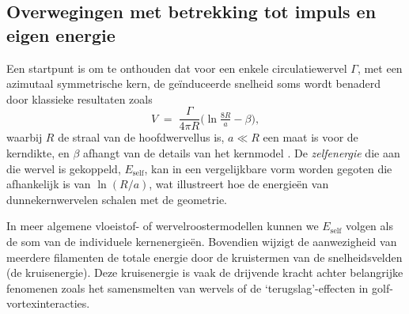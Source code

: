 \subsection{Overwegingen met betrekking tot impuls en eigen energie}
\label{sec:impuls}
Een startpunt is om te onthouden dat voor een enkele circulatiewervel $\Gamma$, met een
azimutaal symmetrische kern, de geïnduceerde snelheid soms wordt benaderd door
klassieke resultaten zoals
\begin{equation}
V \;=\; \frac{\Gamma}{4 \pi R}
\bigl(\ln \tfrac{8 R}{a} - \beta \bigr),\label{eq:appendix:velocity}
\end{equation}
waarbij $R$ de straal van de hoofdwervellus is, $a \ll R$ een maat is voor de kerndikte,
en $\beta$ afhangt van de details van het kernmodel \cite{Saffman1992}. De
\emph{zelfenergie} die aan die wervel is gekoppeld, $E_{\text{self}}$, kan in een
vergelijkbare vorm worden gegoten die afhankelijk is van $\ln(R/a)$, wat illustreert hoe de energieën van dunnekernwervelen
schalen met de geometrie.

In meer algemene vloeistof- of wervelroostermodellen kunnen we $E_{\text{self}}$ volgen als de
som van de individuele kernenergieën. Bovendien wijzigt de aanwezigheid van meerdere filamenten
de totale energie door de kruistermen van de snelheidsvelden (de kruisenergie). Deze
kruisenergie is vaak de drijvende kracht achter belangrijke fenomenen zoals het samensmelten van wervels of de `terugslag'-effecten
in golf-vortexinteracties.

